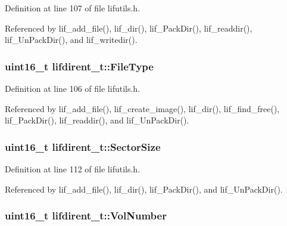Definition at line 107 of file lifutils.\+h.



Referenced by lif\+\_\+add\+\_\+file(), lif\+\_\+dir(), lif\+\_\+\+Pack\+Dir(), lif\+\_\+readdir(), lif\+\_\+\+Un\+Pack\+Dir(), and lif\+\_\+writedir().

\subsubsection[{\texorpdfstring{File\+Type}{FileType}}]{\setlength{\rightskip}{0pt plus 5cm}uint16\+\_\+t lifdirent\+\_\+t\+::\+File\+Type}\hypertarget{structlifdirent__t_a48901a6b2b10471927397b3b569e386a}{}\label{structlifdirent__t_a48901a6b2b10471927397b3b569e386a}


Definition at line 106 of file lifutils.\+h.



Referenced by lif\+\_\+add\+\_\+file(), lif\+\_\+create\+\_\+image(), lif\+\_\+dir(), lif\+\_\+find\+\_\+free(), lif\+\_\+\+Pack\+Dir(), lif\+\_\+readdir(), and lif\+\_\+\+Un\+Pack\+Dir().

\subsubsection[{\texorpdfstring{Sector\+Size}{SectorSize}}]{\setlength{\rightskip}{0pt plus 5cm}uint16\+\_\+t lifdirent\+\_\+t\+::\+Sector\+Size}\hypertarget{structlifdirent__t_a4c2a8fab6d73c7f1baa502c1ebef8658}{}\label{structlifdirent__t_a4c2a8fab6d73c7f1baa502c1ebef8658}


Definition at line 112 of file lifutils.\+h.



Referenced by lif\+\_\+add\+\_\+file(), lif\+\_\+dir(), lif\+\_\+\+Pack\+Dir(), and lif\+\_\+\+Un\+Pack\+Dir().

\subsubsection[{\texorpdfstring{Vol\+Number}{VolNumber}}]{\setlength{\rightskip}{0pt plus 5cm}uint16\+\_\+t lifdirent\+\_\+t\+::\+Vol\+Number}\hypertarget{structlifdirent__t_a9510c4f024400cff22c8abb54a4aca65}{}\label{structlifdirent__t_a9510c4f024400cff22c8abb54a4aca65}


